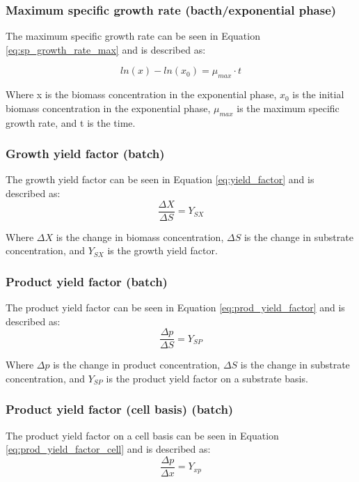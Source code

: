 \subsubsection*{Maximum specific growth rate (bacth/exponential phase)}
The maximum specific growth rate can be seen in Equation \ref*{eq:sp_growth_rate_max} and is described as:

\begin{equation}
    ln(x) - ln (x_0) = \mu_{max} \cdot t
    \label{eq:sp_growth_rate_max}
\end{equation}

Where x is the biomass concentration in the exponential phase, $x_0$ is the initial biomass concentration in the exponential phase, $\mu_{max}$ is the maximum specific growth rate, and t is the time.

\subsubsection*{Growth yield factor (batch)}
The growth yield factor can be seen in Equation \ref*{eq:yield_factor} and is described as:
\begin{equation}
    \frac{\Delta X}{\Delta S} = Y_{SX}
    \label{eq:yield_factor}
\end{equation}

Where $\Delta X$ is the change in biomass concentration, $\Delta S$ is the change in substrate concentration, and $Y_{SX}$ is the growth yield factor.

\subsubsection*{Product yield factor (batch)}
The product yield factor can be seen in Equation \ref*{eq:prod_yield_factor} and is described as:
\begin{equation}
    \frac{\Delta p}{\Delta S} = Y_{SP}
    \label{eq:prod_yield_factor}
\end{equation}

Where $\Delta p$ is the change in product concentration, $\Delta S$ is the change in substrate concentration, and $Y_{SP}$ is the product yield factor on a substrate basis.

\subsubsection*{Product yield factor (cell basis) (batch)}
The product yield factor on a cell basis can be seen in Equation \ref*{eq:prod_yield_factor_cell} and is described as: 
\begin{equation}
    \frac{\Delta p}{\Delta x} = Y_{xp}
    \label{eq:prod_yield_factor_cell}
\end{equation}

